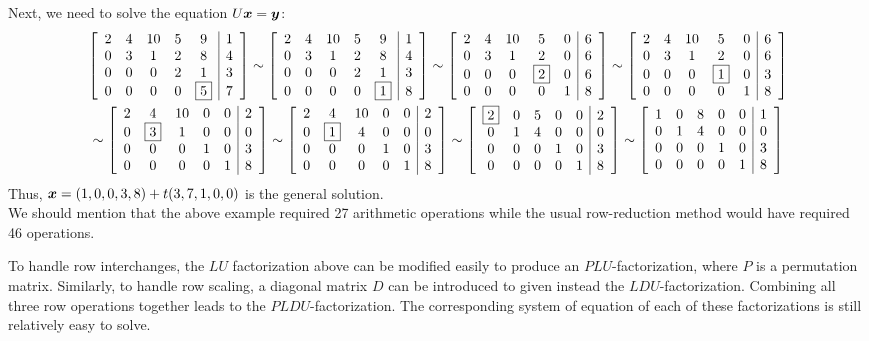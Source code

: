 \begin{Exam}
Next, we need to solve the equation $U\bb x = \bb y$:\\
\begin{multline*} \mtx{ccccc|c}{2&4&10&5&9&1\\0&3&1&2&8&4\\0&0&0&2&1&3\\0&0&0&0&\fbox{5}&7}\sim \mtx{ccccc|c}{2&4&10&5&9&1\\0&3&1&2&8&4\\0&0&0&2&1&3\\0&0&0&0&\fbox{1}&8}\sim \mtx{ccccc|c}{2&4&10&5&0&6\\0&3&1&2&0&6\\0&0&0&\fbox{2}&0&6\\0&0&0&0&1&8} \sim \mtx{ccccc|c}{2&4&10&5&0&6\\0&3&1&2&0&6\\0&0&0&\fbox{1}&0&3\\0&0&0&0&1&8}\\ \sim \mtx{ccccc|c}{2&4&10&0&0&2\\0&\fbox{3}&1&0&0&0\\0&0&0&1&0&3\\0&0&0&0&1&8}\sim \mtx{ccccc|c}{2&4&10&0&0&2\\0&\fbox{1}&4&0&0&0\\0&0&0&1&0&3\\0&0&0&0&1&8}\sim \mtx{ccccc|c}{\fbox{2}&0&5&0&0&2\\0&1&4&0&0&0\\0&0&0&1&0&3\\0&0&0&0&1&8}\sim \mtx{ccccc|c}{1&0&8&0&0&1\\0&1&4&0&0&0\\0&0&0&1&0&3\\0&0&0&0&1&8}
\end{multline*}
Thus, $\bb x = (1,0,0,3,8) + t(3,7,1,0,0)$ is the general solution.\\

We should mention that the above example required 27 arithmetic operations while the usual row-reduction method would have required 46 operations.
\end{Exam}\vs

To handle row interchanges, the $LU$ factorization above can be modified easily to produce an $PLU$-factorization, where $P$ is a permutation matrix. Similarly, to handle row scaling, a diagonal matrix $D$ can be introduced to given instead the $LDU$-factorization. Combining all three row operations together leads to the $PLDU$-factorization. The corresponding system of equation of each of these factorizations is still relatively easy to solve.

